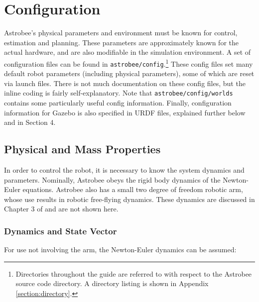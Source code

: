 \documentclass{article}
\begin{document}
\clearpage
\section{Configuration}

Astrobee's physical parameters and environment must be known for control, estimation and planning. These parameters are approximately known for the actual hardware, and are also modifiable in the simulation environment. A set of configuration files can be found in \texttt{astrobee/config}.\footnote{Directories throughout the guide are referred to with respect to the Astrobee source code directory. A directory listing is shown in Appendix \ref{section:directory}.} These config files set many default robot parameters (including physical parameters), some of which are reset via launch files. There is not much documentation on these config files, but the inline coding is fairly self-explanatory. Note that \texttt{astrobee/config/worlds} contains some particularly useful config information. Finally, configuration information for Gazebo is also specified in URDF files, explained further below and in Section 4.

\subsection{Physical and Mass Properties}

In order to control the robot, it is necessary to know the system dynamics and parameters. Nominally, Astrobee obeys the rigid body dynamics of the Newton-Euler equations. Astrobee also has a small two degree of freedom robotic arm, whose use results in robotic free-flying dynamics. These dynamics are discussed in Chapter 3 of \cite{Albee2019} and are not shown here.

\subsubsection{Dynamics and State Vector}
For use not involving the arm, the Newton-Euler dynamics can be assumed:
\end{document}
